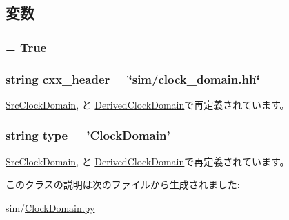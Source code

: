 \subsection{変数}
\hypertarget{classClockDomain_1_1ClockDomain_a17fa61ac3806b481cafee5593b55e5d0}{
\subsubsection[{abstract}]{ = True}}
\label{classClockDomain_1_1ClockDomain_a17fa61ac3806b481cafee5593b55e5d0}
\hypertarget{classClockDomain_1_1ClockDomain_a17da7064bc5c518791f0c891eff05fda}{
\subsubsection[{cxx\_\-header}]{\setlength{\rightskip}{0pt plus 5cm}string {\bf cxx\_\-header} = \char`\"{}sim/clock\_\-domain.hh\char`\"{}}}
\label{classClockDomain_1_1ClockDomain_a17da7064bc5c518791f0c891eff05fda}


\hyperlink{classClockDomain_1_1SrcClockDomain_a17da7064bc5c518791f0c891eff05fda}{SrcClockDomain}, と \hyperlink{classClockDomain_1_1DerivedClockDomain_a17da7064bc5c518791f0c891eff05fda}{DerivedClockDomain}で再定義されています。\hypertarget{classClockDomain_1_1ClockDomain_acce15679d830831b0bbe8ebc2a60b2ca}{
\subsubsection[{type}]{\setlength{\rightskip}{0pt plus 5cm}string {\bf type} = '{\bf ClockDomain}'}}
\label{classClockDomain_1_1ClockDomain_acce15679d830831b0bbe8ebc2a60b2ca}


\hyperlink{classClockDomain_1_1SrcClockDomain_acce15679d830831b0bbe8ebc2a60b2ca}{SrcClockDomain}, と \hyperlink{classClockDomain_1_1DerivedClockDomain_acce15679d830831b0bbe8ebc2a60b2ca}{DerivedClockDomain}で再定義されています。

このクラスの説明は次のファイルから生成されました:\begin{DoxyCompactItemize}
\item 
sim/\hyperlink{ClockDomain_8py}{ClockDomain.py}\end{DoxyCompactItemize}
